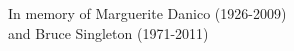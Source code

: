 \documentclass[a4paper,12pt]{report} 	%
\numberwithin{figure}{chapter}
\numberwithin{table}{chapter}
\numberwithin{equation}{chapter}
\begin{document}
\newpage
\begin{center}
\vspace*{\fill}
In memory of Marguerite Danico (1926-2009)\\ and Bruce Singleton (1971-2011)
\vspace*{\fill}
\end{center}

\setcounter{tocdepth}{4}			%
\setcounter{secnumdepth}{4}

\linespread{2}					%
\selectfont			
\setcounter{page}{3}
\tableofcontents

\newpage
{} 
\listoffigures

\newpage
{}
\listoftables
	
\newlength{\QuarterPage}
\setlength{\QuarterPage}{1.0in}
\end{document}
